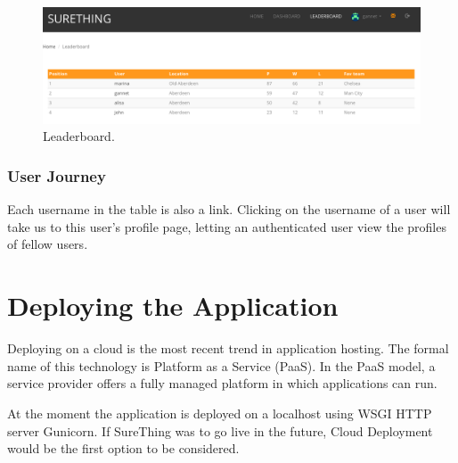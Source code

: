 \begin{figure}[H]
	\begin{center}
		\includegraphics[width=.90\textwidth]{impl/images/leaderboard}
		\caption{Leaderboard.} \label{fig:using: leaderboard}
	\end{center}
\end{figure}

\subsubsection*{User Journey}
\label{subsec:leaderboarduserjourney}
Each username in the table is also a link. Clicking on the username of a user will take us to this user's profile page, letting an authenticated user view the profiles of fellow users.

\section{Deploying the Application}
Deploying on a cloud is the most recent trend in application hosting. The formal name of this technology is Platform as a Service (PaaS). In the PaaS model, a service provider offers a fully managed platform in which applications can run.

At the moment the application is deployed on a localhost using WSGI HTTP server Gunicorn. If SureThing was to go live in the future, Cloud Deployment would be the first option to be considered. 